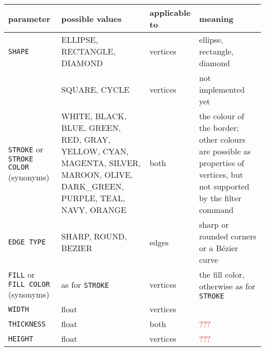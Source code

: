 \begin{table}
  \centering
  \begin{tabular}{p{3cm}|p{5cm}|p{1.8cm}|p{5cm}}
    \textbf{parameter} &  \textbf{possible values} & \textbf{applicable to}  & \textbf{meaning}\\
    \hline
    \texttt{SHAPE}     &  ELLIPSE, RECTANGLE, DIAMOND & vertices& ellipse,
                                                                  rectangle, diamond\\
                       &  SQUARE, CYCLE & vertices & not implemented yet\\
    \hline
    \texttt{STROKE} or \texttt{STROKE COLOR} (synonyms)
                       &  WHITE, BLACK, BLUE, GREEN, RED, GRAY, \mbox{YELLOW},
                         CYAN, MAGENTA, SILVER, MAROON, OLIVE,
                         DARK\_GREEN, PURPLE, TEAL, NAVY, ORANGE
                                                   & both & the colour of the
                                                            border; other
                                                            colours are
                                                            possible as
                                                            properties of
                                                            vertices, but not
                                                            supported by the
                                                            filter
                                                            command\\
    \hline
    \texttt{EDGE TYPE} & SHARP, ROUND, BEZIER & edges & sharp or rounded
                                                        corners or a
                                                        B\'{e}zier curve\\
    \hline
    \texttt{FILL} or \texttt{FILL COLOR} (synonyms)
                       & as for \texttt{STROKE} & vertices & the fill color,
                                                             otherwise as for
                                                             \texttt{STROKE}\\
    \hline
    \texttt{WIDTH}     & float                 & vertices & \tcr{???}\\
    \hline
    \texttt{THICKNESS} & float                 & both\tcr{?} & \textcolor{red}{???}\\
    \hline
    \texttt{HEIGHT}     & float                & vertices  & \textcolor{red}{???}\\
    \hline

\end{tabular}
\end{table}
